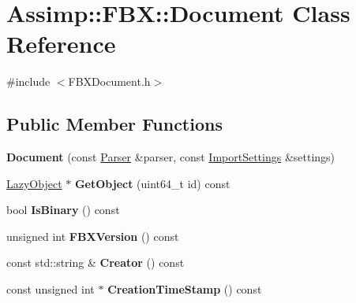 \hypertarget{class_assimp_1_1_f_b_x_1_1_document}{\section{Assimp\+:\+:F\+B\+X\+:\+:Document Class Reference}
\label{class_assimp_1_1_f_b_x_1_1_document}
}


{\ttfamily \#include $<$F\+B\+X\+Document.\+h$>$}

\subsection*{Public Member Functions}
\begin{DoxyCompactItemize}
\item 
\hypertarget{class_assimp_1_1_f_b_x_1_1_document_a9ed33c791a7a1ec71dae092b3d56025e}{{\bfseries Document} (const \hyperlink{class_assimp_1_1_f_b_x_1_1_parser}{Parser} \&parser, const \hyperlink{struct_assimp_1_1_f_b_x_1_1_import_settings}{Import\+Settings} \&settings)}\label{class_assimp_1_1_f_b_x_1_1_document_a9ed33c791a7a1ec71dae092b3d56025e}

\item 
\hypertarget{class_assimp_1_1_f_b_x_1_1_document_a938873041385d44f935fff7ed15e2e40}{\hyperlink{class_assimp_1_1_f_b_x_1_1_lazy_object}{Lazy\+Object} $\ast$ {\bfseries Get\+Object} (uint64\+\_\+t id) const }\label{class_assimp_1_1_f_b_x_1_1_document_a938873041385d44f935fff7ed15e2e40}

\item 
\hypertarget{class_assimp_1_1_f_b_x_1_1_document_ac20eb095c980dea83a95ad4470f6738c}{bool {\bfseries Is\+Binary} () const }\label{class_assimp_1_1_f_b_x_1_1_document_ac20eb095c980dea83a95ad4470f6738c}

\item 
\hypertarget{class_assimp_1_1_f_b_x_1_1_document_ad212204df8f3ccead553e60138ea0f88}{unsigned int {\bfseries F\+B\+X\+Version} () const }\label{class_assimp_1_1_f_b_x_1_1_document_ad212204df8f3ccead553e60138ea0f88}

\item 
\hypertarget{class_assimp_1_1_f_b_x_1_1_document_aa453136f7699d101e326559ba87b63ba}{const std\+::string \& {\bfseries Creator} () const }\label{class_assimp_1_1_f_b_x_1_1_document_aa453136f7699d101e326559ba87b63ba}

\item 
\hypertarget{class_assimp_1_1_f_b_x_1_1_document_a0610bd610326e3b64b3b84107e64fb5b}{const unsigned int $\ast$ {\bfseries Creation\+Time\+Stamp} () const }\label{class_assimp_1_1_f_b_x_1_1_document_a0610bd610326e3b64b3b84107e64fb5b}


\end{DoxyCompactItemize}
